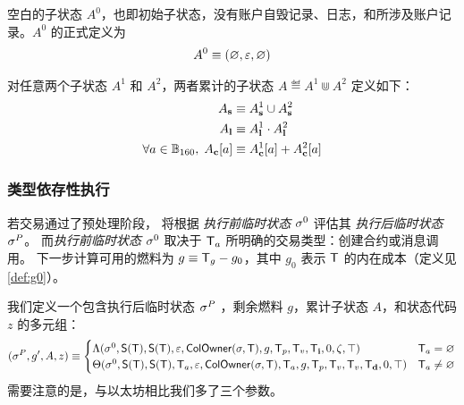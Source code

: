 空白的子状态 $A^0$，也即初始子状态，没有账户自毁记录、日志，和所涉及账户记录。$A^0$ 的正式定义为
\begin{align}
	A^0\equiv \left( \varnothing, \mathbb{\varepsilon}, \varnothing\right)
\end{align}

对任意两个子状态 $A^1$ 和 $A^2$，两者累计的子状态 $A\eqdef A^1\Cup A^2$ 定义如下：
\begin{align}
	A_{\bf s} &\equiv A^1_{\bf s} \cup A^2_{\bf s} \\ 
	A_{\bf l} &\equiv A^1_{\bf l} \cdot A^2_{\bf l} \\
	\forall a\in\mathbb{B}_{160},\; A_{\bf c}[a] & \equiv A^1_{\bf c}[a]+A^2_{\bf c}[a]
\end{align}


\subsubsection{类型依存性执行}

若交易通过了预处理阶段，
{\name} 将根据 \emph{执行前临时状态} $\mathbf{\sigma}^0$ 评估其 \emph{执行后临时状态} $\mathbf{\sigma}^P$。
而\emph{执行前临时状态} $\mathbf{\sigma}^0$ 取决于 $\textsf{T}_a$ 所明确的交易类型：创建合约或消息调用。
%
下一步计算可用的燃料为 $g\equiv \textsf{T}_g-g_0$，其中 $g_0$ 表示 $\textsf{T}$ 的内在成本（定义见 \ref{def:g0}）。

我们定义一个包含执行后临时状态 $\mathbf{\sigma}^{P}$ ，剩余燃料 $g$，累计子状态 $A$，和状态代码 $z$ 的多元组：
\begin{align}\label{def:transform}
	(\mathbf{\sigma}^{P},g',A,z)\equiv
	\begin{cases}
		\mathrm{\Lambda}(\mathbf{\sigma}^0,\mathsf{S}{\left({\textsf{T}} \right)},\mathsf{S}{\left({\textsf{T}} \right)},\mathbb{\varepsilon}, \mathsf{ColOwner}(\mathbf{\sigma},\textsf{T}),g,\textsf{T}_p,\textsf{T}_v,\textsf{T}_{\bf i},0,\zeta,\top) &  \textsf{T}_a=\varnothing \\
		\mathrm{\Theta}(\mathbf{\sigma}^0,\mathsf{S}{\left({\textsf{T}} \right)},\mathsf{S}{\left({\textsf{T}} \right)},\textsf{T}_a,\mathbb{\varepsilon},\mathsf{ColOwner}(\mathbf{\sigma},\textsf{T}),\textsf{T}_a,g,\textsf{T}_p,\textsf{T}_v,\textsf{T}_v,\textsf{T}_{\bf d},0,\top) & \textsf{T}_a\neq\varnothing
	\end{cases}
\end{align}
%
需要注意的是，与以太坊相比我们多了三个参数。

